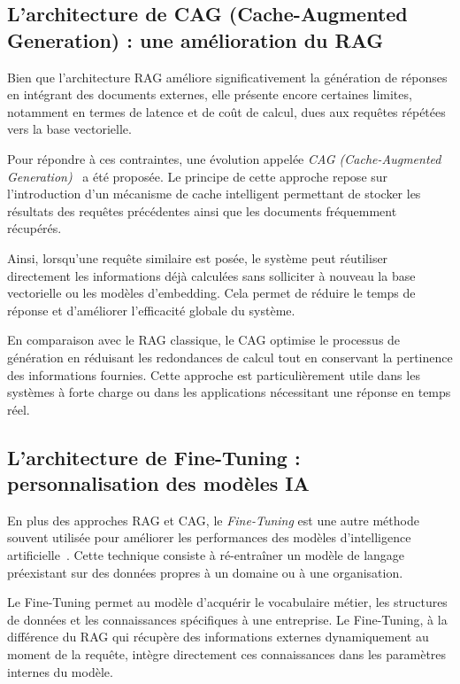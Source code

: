 \subsection{L'architecture de CAG (Cache-Augmented Generation) : une amélioration du RAG}

Bien que l'architecture RAG améliore significativement la génération de réponses en intégrant des documents externes, elle présente encore certaines limites, notamment en termes de latence et de coût de calcul, dues aux requêtes répétées vers la base vectorielle.

Pour répondre à ces contraintes, une évolution appelée \textit{CAG (Cache-Augmented Generation)}~\cite{chan2024cag} a été proposée. Le principe de cette approche repose sur l'introduction d'un mécanisme de cache intelligent permettant de stocker les résultats des requêtes précédentes ainsi que les documents fréquemment récupérés.

Ainsi, lorsqu'une requête similaire est posée, le système peut réutiliser directement les informations déjà calculées sans solliciter à nouveau la base vectorielle ou les modèles d'embedding. Cela permet de réduire le temps de réponse et d'améliorer l'efficacité globale du système.

En comparaison avec le RAG classique, le CAG optimise le processus de génération en réduisant les redondances de calcul tout en conservant la pertinence des informations fournies. Cette approche est particulièrement utile dans les systèmes à forte charge ou dans les applications nécessitant une réponse en temps réel.

\subsection{L'architecture de Fine-Tuning : personnalisation des modèles IA}

En plus des approches RAG et CAG, le \textit{Fine-Tuning} est une autre méthode souvent utilisée pour améliorer les performances des modèles d'intelligence artificielle~\cite{devlin2019bert}. Cette technique consiste à ré-entraîner un modèle de langage préexistant sur des données propres à un domaine ou à une organisation.

Le Fine-Tuning permet au modèle d'acquérir le vocabulaire métier, les structures de données et les connaissances spécifiques à une entreprise. Le Fine-Tuning, à la différence du RAG qui récupère des informations externes dynamiquement au moment de la requête, intègre directement ces connaissances dans les paramètres internes du modèle.

